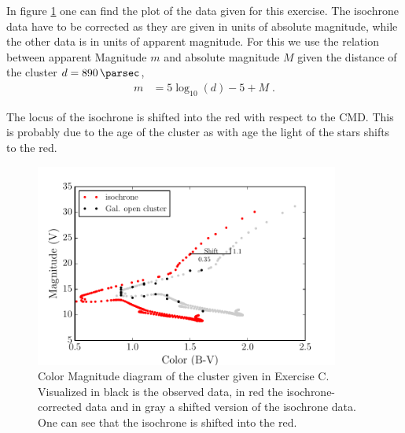 \documentclass[11pt,a4paper,twoside]{article}
\newcommand{\op}[1]{\operatorname{#1}}
\begin{document}
In figure \ref{fig:cmd} one can find the plot of the data given for this 
exercise. 
The isochrone data have to be corrected as they are given in units of absolute
magnitude, while the other data is in units of apparent magnitude. For this
we use the relation between apparent Magnitude $m$ and absolute magnitude $M$
given the distance of the cluster $d = \SI{890}{\parsec}$,
\begin{align}
    m &= 5\op{log}_{10}(d) - 5 + M \;.
\end{align}

The locus of the isochrone is shifted into the red with respect to the CMD. 
This is probably due to the age of the cluster as with age the light of the 
stars shifts to the red.


\begin{figure}
\centering
\includegraphics[width=10cm]{pic/CMD}
\caption{Color Magnitude diagram of the cluster given in Exercise C. 
         Visualized in black is the observed data, in red the 
         isochrone-corrected data and in gray a shifted version of the 
         isochrone data. One can see that the isochrone is shifted into the 
         red.}
\label{fig:cmd}
\end{figure}
\end{document}
